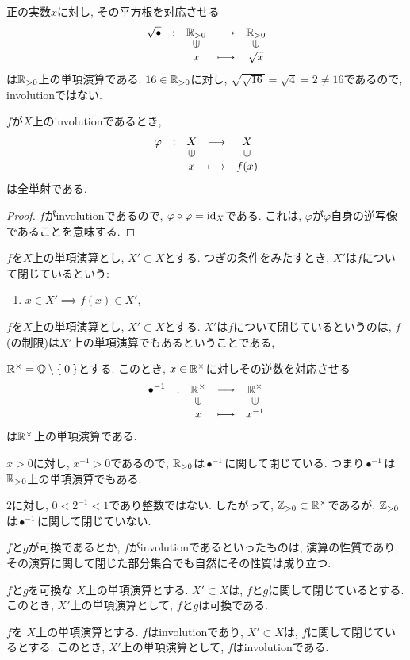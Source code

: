 \begin{example}
  正の実数$x$に対し, その平方根を対応させる
  \begin{align*}
    \shazo{\sqrt{\bullet}}
          {\RR_{>0}}{\RR_{>0}}
          {x}{\sqrt{x}}
  \end{align*}
  は$\mathbb{R}_{>0}$上の単項演算である.
  $16\in\mathbb{R}_{>0}$に対し,
  $\sqrt{\sqrt{16}}=\sqrt{4}=2\neq 16$であるので,
  involutionではない.
\end{example}
\begin{prop}
  $f$が$X$上のinvolutionであるとき,
  \begin{align*}
    \shazo{\varphi}
          {X}{X}
          {x}{f(x)}
  \end{align*}
  は全単射である.
\end{prop}
\begin{proof}
  $f$がinvolutionであるので, $\varphi\circ\varphi=\operatorname{id}_X$である.
  これは, $\varphi$が$\varphi$自身の逆写像であることを意味する.
\end{proof}
\begin{definition}
  $f$を$X$上の単項演算とし,
  $X'\subset X$とする.
  つぎの条件をみたすとき,
  $X'$は$f$について閉じているという:
  \begin{enumerate}
  \item $x\in X'\implies f(x)\in X'$,
  \end{enumerate}
\end{definition}
\begin{remark}
  $f$を$X$上の単項演算とし,
  $X'\subset X$とする.
  $X'$は$f$について閉じているというのは,
  $f$(の制限)は$X'$上の単項演算でもあるということである,
\end{remark}
\begin{example}
  $\mathbb{R}^\times = \mathbb{Q}\setminus\Set{0}$とする.
  このとき,
  $x\in\mathbb{R}^\times$に対しその逆数を対応させる
  \begin{align*}
    \shazo{\bullet^{-1}}
          {\RR^{\times}}{\RR^{\times}}
          {x}{x^{-1}}
  \end{align*}
  は$\mathbb{R}^\times$上の単項演算である.

  $x>0$に対し, $x^{-1}>0$であるので,
  $\mathbb{R}_{>0}$は$\bullet^{-1}$に関して閉じている.
  つまり$\bullet^{-1}$は$\mathbb{R}_{>0}$上の単項演算でもある.

  $2$に対し, $0<2^{-1}<1$であり整数ではない.
  したがって, $\mathbb{Z}_{>0}\subset \mathbb{R}^{\times}$であるが,
  $\mathbb{Z}_{>0}$は$\bullet^{-1}$に関して閉じていない.
\end{example}

$f$と$g$が可換であるとか,
$f$がinvolutionであるといったものは,
演算の性質であり,
その演算に関して閉じた部分集合でも自然にその性質は成り立つ.
\begin{prop}
  $f$と$g$を可換な
  $X$上の単項演算とする.
  $X'\subset X$は, $f$と$g$に関して閉じているとする.
  このとき,
  $X'$上の単項演算として, $f$と$g$は可換である.
\end{prop}
\begin{prop}
  $f$を
  $X$上の単項演算とする.
  $f$はinvolutionであり,
  $X'\subset X$は, $f$に関して閉じているとする.
  このとき,
  $X'$上の単項演算として,
  $f$はinvolutionである.
\end{prop}



